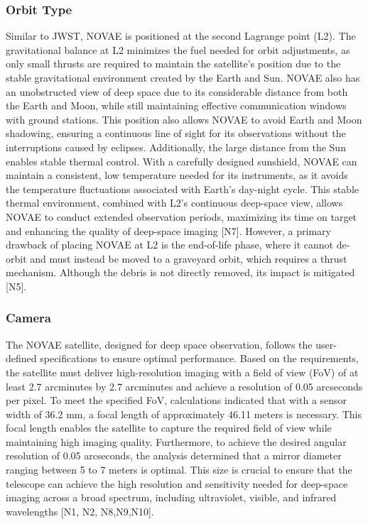 \subsubsection{Orbit Type}
Similar to JWST, NOVAE is positioned at the second Lagrange point (L2). The gravitational balance at L2 minimizes the fuel needed for orbit adjustments, as only small thrusts are required to maintain the satellite’s position due to the stable gravitational environment created by the Earth and Sun. NOVAE also has an unobstructed view of deep space due to its considerable distance from both the Earth and Moon, while still maintaining effective communication windows with ground stations. This position also allows NOVAE to avoid Earth and Moon shadowing, ensuring a continuous line of sight for its observations without the interruptions caused by eclipses. Additionally, the large distance from the Sun enables stable thermal control. With a carefully designed sunshield, NOVAE can maintain a consistent, low temperature needed for its instruments, as it avoids the temperature fluctuations associated with Earth's day-night cycle. This stable thermal environment, combined with L2’s continuous deep-space view, allows NOVAE to conduct extended observation periods, maximizing its time on target and enhancing the quality of deep-space imaging [N7]. However, a primary drawback of placing NOVAE at L2 is the end-of-life phase, where it cannot de-orbit and must instead be moved to a graveyard orbit, which requires a thrust mechanism. Although the debris is not directly removed, its impact is mitigated [N5].

\subsubsection{Camera}

\vspace{1.5mm}
The NOVAE satellite, designed for deep space observation, follows the user-defined specifications to ensure optimal performance. Based on the requirements, the satellite must deliver high-resolution imaging with a field of view (FoV) of at least 2.7 arcminutes by 2.7 arcminutes and achieve a resolution of 0.05 arcseconds per pixel. To meet the specified FoV, calculations indicated that with a sensor width of 36.2 mm, a focal length of approximately 46.11 meters is necessary. This focal length enables the satellite to capture the required field of view while maintaining high imaging quality. Furthermore, to achieve the desired angular resolution of 0.05 arcseconds, the analysis determined that a mirror diameter ranging between 5 to 7 meters is optimal. This size is crucial to ensure that the telescope can achieve the high resolution and sensitivity needed for deep-space imaging across a broad spectrum, including ultraviolet, visible, and infrared wavelengths [N1, N2, N8,N9,N10].


